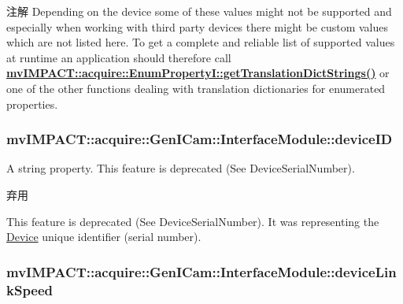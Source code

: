 \begin{DoxyNote}{注解}
Depending on the device some of these values might not be supported and especially when working with third party devices there might be custom values which are not listed here. To get a complete and reliable list of supported values at runtime an application should therefore call {\bfseries \hyperlink{classmv_i_m_p_a_c_t_1_1acquire_1_1_enum_property_i_a0ba6ccbf5ee69784d5d0b537924d26b6}{mv\+I\+M\+P\+A\+C\+T\+::acquire\+::\+Enum\+Property\+I\+::get\+Translation\+Dict\+Strings()}} or one of the other functions dealing with translation dictionaries for enumerated properties. 
\end{DoxyNote}
\hypertarget{classmv_i_m_p_a_c_t_1_1acquire_1_1_gen_i_cam_1_1_interface_module_a44a420f9d0bf26a8d877026b3e12ea06}{
\subsubsection[{device\+I\+D}]{ mv\+I\+M\+P\+A\+C\+T\+::acquire\+::\+Gen\+I\+Cam\+::\+Interface\+Module\+::device\+I\+D}}\label{classmv_i_m_p_a_c_t_1_1acquire_1_1_gen_i_cam_1_1_interface_module_a44a420f9d0bf26a8d877026b3e12ea06}


A string property. This feature is deprecated (See Device\+Serial\+Number). 

\begin{DoxyRefDesc}{弃用}
\item[\hyperlink{deprecated__deprecated000096}{弃用}]This feature is deprecated (See Device\+Serial\+Number). It was representing the \hyperlink{classmv_i_m_p_a_c_t_1_1acquire_1_1_device}{Device} unique identifier (serial number). \end{DoxyRefDesc}
\hypertarget{classmv_i_m_p_a_c_t_1_1acquire_1_1_gen_i_cam_1_1_interface_module_af3a2712bc9fcd0b70d13b22c9e30d3e3}{
\subsubsection[{device\+Link\+Speed}]{ mv\+I\+M\+P\+A\+C\+T\+::acquire\+::\+Gen\+I\+Cam\+::\+Interface\+Module\+::device\+Link\+Speed}}\label{classmv_i_m_p_a_c_t_1_1acquire_1_1_gen_i_cam_1_1_interface_module_af3a2712bc9fcd0b70d13b22c9e30d3e3}


